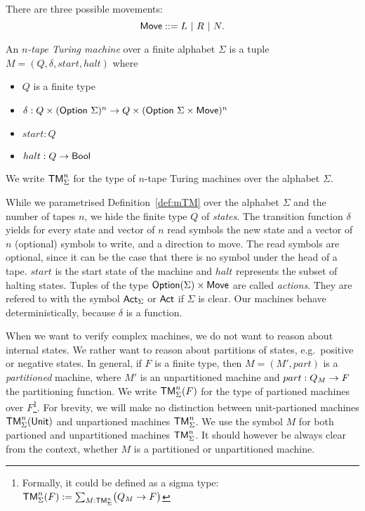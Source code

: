 \begin{definition}[Movement]
  \label{def:movement}
  There are three possible movements:
  $$\textsf{Move} ::= L ~|~ R ~|~ N.$$
\end{definition}


\begin{definition}
  \label{def:mTM}
  An \emph{$n$-tape Turing machine} over a finite alphabet $\Sigma$ is a tuple $M = (Q, \delta, start, halt)$ where
  \begin{itemize}
  \item $Q$ is a finite type
  \item $\delta : Q \times (\textsf{Option}~\Sigma)^n \rightarrow Q \times (\textsf{Option}~\Sigma \times \textsf{Move})^n$
  \item $start:Q$
  \item $halt : Q \rightarrow \textsf{Bool}$ 
  \end{itemize}
\end{definition}

We write $\textsf{TM}_\Sigma^n$ for the type of $n$-tape Turing machines over the alphabet $\Sigma$.

While we parametrised Definition~\ref{def:mTM} over the alphabet $\Sigma$ and the number of tapes $n$, we hide the finite type $Q$ of \emph{states}.
The transition function $\delta$ yields for every state and vector of $n$ read symbols the new state and a vector of $n$ (optional) symbols to write,
and a direction to move.  The read symbols are optional, since it can be the case that there is no symbol under the head of a tape.  $start$ is the
start state of the machine and $halt$ represents the subset of halting states.  Tuples of the type $\textsf{Option}(\Sigma) \times \textsf{Move}$ are called
\emph{actions}.  They are refered to with the symbol $\textsf{Act}_\Sigma$ or $\textsf{Act}$ if $\Sigma$ is clear.  Our machines behave deterministically,
because $\delta$ is a function.

When we want to verify complex machines, we do not want to reason about internal states.  We rather want to reason about partitions of states, e.g.\
positive or negative states.  In general, if $F$ is a finite type, then $M = (M', part)$ is a \emph{partitioned} machine, where $M'$ is an
unpartitioned machine and $part : Q_M \rightarrow F$ the partitioning function.  We write $\textsf{TM}_\Sigma^n(F)$ for the type of partioned machines over
$F$\footnote{Formally, it could be defined as a sigma type: $\textsf{TM}_\Sigma^n(F) := \sum_{M:\textsf{TM}_\Sigma^n}\bigl(Q_M \rightarrow F\bigr)$}.  For brevity, we
will make no distinction between unit-partioned machines $\textsf{TM}_\Sigma^n(\textsf{Unit})$ and unpartioned machines $\textsf{TM}_\Sigma^n$.  We use the symbol $M$ for
both partioned and unpartitioned machines $\textsf{TM}_\Sigma^n$.  It should however be always clear from the context, whether $M$ is a partitioned or
unpartitioned machine.

